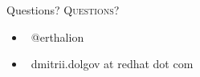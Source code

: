 \documentclass[usenames,dvipsnames, 18pt, compress, aspectratio=169]{beamer}
\def\twitter{{\FA \faTwitter}}
\def\email{{\FA \faEnvelope}}
\begin{document}
\fontsize{18pt}{18}\selectfont
\begin{frame}
  \vspace*{2.5cm}
  \begin{minipage}[b][\paperheight]{\textwidth}
  \begin{center}

      \linespread{1.0}%
      \if@noSmallCapitals%
        Questions?
      \else%
        \scshape{\color{black} Questions?}%
      \fi%
      \vspace*{0.3em}

      \fontsize{13pt}{14}\selectfont
        \begin{itemize}[label={}]
            \item {\color{black} \twitter\ @erthalion}
            \item {\color{black} \email\ dmitrii.dolgov at redhat dot com}
        \end{itemize}
      \vspace*{2.5em}%

    \vfill
    \vspace*{2em}
  \end{center}
  \end{minipage}
\end{frame}
\end{document}
